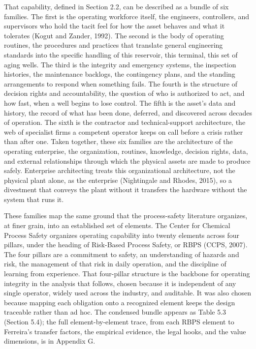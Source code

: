 \documentclass[twoside,fontset=lmodern]{mitthesis}
\begin{document}
That capability, defined in Section 2.2, can be described as a bundle of
six families. The first is the operating workforce itself, the
engineers, controllers, and supervisors who hold the tacit feel for how
the asset behaves and what it tolerates (Kogut and Zander, 1992). The
second is the body of operating routines, the procedures and practices
that translate general engineering standards into the specific handling
of this reservoir, this terminal, this set of aging wells. The third is
the integrity and emergency systems, the inspection histories, the
maintenance backlogs, the contingency plans, and the standing
arrangements to respond when something fails. The fourth is the
structure of decision rights and accountability, the question of who is
authorized to act, and how fast, when a well begins to lose control. The
fifth is the asset's data and history, the record of what has been done,
deferred, and discovered across decades of operation. The sixth is the
contractor and technical-support architecture, the web of specialist
firms a competent operator keeps on call before a crisis rather than
after one. Taken together, these six families are the architecture of
the operating enterprise, the organization, routines, knowledge,
decision rights, data, and external relationships through which the
physical assets are made to produce safely. Enterprise architecting
treats this organizational architecture, not the physical plant alone,
as the enterprise (Nightingale and Rhodes, 2015), so a divestment that
conveys the plant without it transfers the hardware without the system
that runs it.

These families map the same ground that the process-safety literature
organizes, at finer grain, into an established set of elements. The
Center for Chemical Process Safety organizes operating capability into
twenty elements across four pillars, under the heading of Risk-Based
Process Safety, or RBPS (CCPS, 2007). The four pillars are a commitment
to safety, an understanding of hazards and risk, the management of that
risk in daily operation, and the discipline of learning from experience.
That four-pillar structure is the backbone for operating integrity in
the analysis that follows, chosen because it is independent of any
single operator, widely used across the industry, and auditable. It was
also chosen because mapping each obligation onto a recognized element
keeps the design traceable rather than ad hoc. The condensed bundle
appears as Table 5.3 (Section 5.4); the full element-by-element trace,
from each RBPS element to Ferreira's transfer factors, the empirical
evidence, the legal hooks, and the value dimensions, is in Appendix G.
\end{document}
